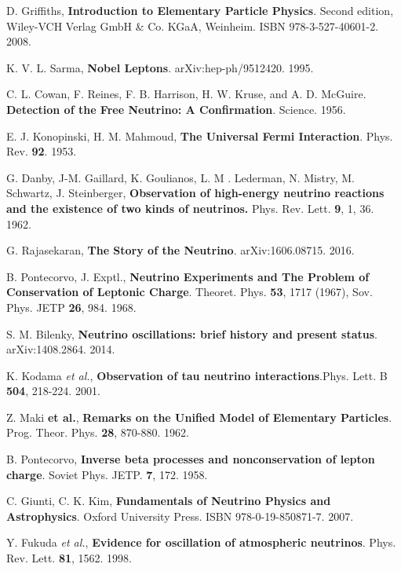  D. Griffiths, \textbf{Introduction to Elementary Particle Physics}. Second edition, Wiley-VCH Verlag GmbH \& Co. KGaA, Weinheim. ISBN 978-3-527-40601-2. 2008.

 K. V. L. Sarma, \textbf{Nobel Leptons}. arXiv:hep-ph/9512420. 1995.

 C. L. Cowan, F. Reines, F. B. Harrison, H. W. Kruse, and A. D. McGuire. \textbf{Detection of the Free Neutrino: A Confirmation}. Science. 1956.

 E. J. Konopinski, H. M. Mahmoud, \textbf{The Universal Fermi Interaction}. Phys. Rev. \textbf{92}. 1953.

 G. Danby, J-M. Gaillard, K. Goulianos, L. M . Lederman, N. Mistry, M. Schwartz, J. Steinberger, \textbf{Observation of high-energy neutrino reactions and the existence of two kinds of neutrinos.} Phys. Rev. Lett. \textbf{9}, 1, 36. 1962.

 G. Rajasekaran, \textbf{The Story of the Neutrino}. arXiv:1606.08715. 2016.

 B. Pontecorvo, J. Exptl., \textbf{Neutrino Experiments and The Problem of Conservation of Leptonic Charge}. Theoret. Phys. \textbf{53}, 1717 (1967), Sov. Phys. JETP \textbf{26}, 984. 1968.

 S. M. Bilenky, \textbf{Neutrino oscillations: brief history and present status}. arXiv:1408.2864. 2014.

K. Kodama \textit{et al.}, \textbf{Observation of tau neutrino interactions}.Phys. Lett. B \textbf{504}, 218-224. 2001. 

 Z. Maki \textbf{et al.}, \textbf{Remarks on the Unified Model of Elementary Particles}. Prog. Theor. Phys. \textbf{28}, 870-880. 1962.

 B. Pontecorvo, \textbf{Inverse beta processes and nonconservation of lepton charge}. Soviet Phys. JETP. \textbf{7}, 172. 1958.

 C. Giunti, C. K. Kim, \textbf{Fundamentals of Neutrino Physics and Astrophysics}. Oxford University Press. ISBN 978-0-19-850871-7. 2007.

 Y. Fukuda \textit{et al.}, \textbf{Evidence for oscillation of atmospheric neutrinos}. Phys. Rev. Lett. \textbf{81}, 1562. 1998.  

